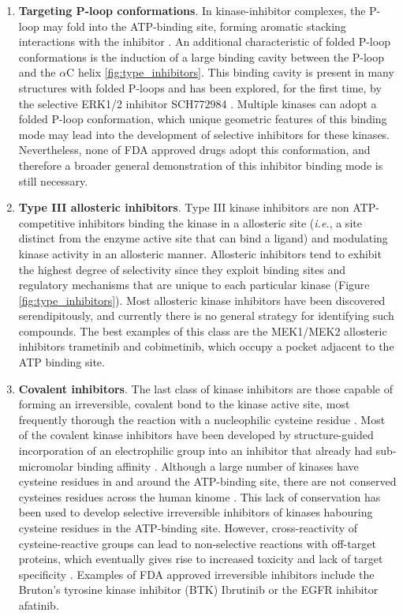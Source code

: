 \documentclass[11pt, b5paper,twoside]{tesi_upf}
\begin{document}
\begin{enumerate}
\item \textbf{Targeting P-loop conformations}. In kinase-inhibitor complexes, the P-loop may fold into the ATP-binding site, forming aromatic stacking interactions with the inhibitor \cite{Guimaraes2011}. An additional characteristic of folded P-loop conformations is the induction of a large binding cavity between the P-loop and the $\alpha$C helix \ref{fig:type_inhibitors}. This binding cavity is present in many structures with folded P-loops and has been explored, for the first time, by the selective ERK1/2 inhibitor SCH772984 \cite{Morris2013}. Multiple kinases can adopt a folded P-loop conformation, which unique geometric features of this binding mode may lead into the development of selective inhibitors for these kinases. Nevertheless, none of FDA approved drugs adopt this conformation, and therefore a broader general demonstration of this inhibitor binding mode is still necessary. 

\item \textbf{Type III allosteric inhibitors}. Type III kinase inhibitors are non ATP-competitive inhibitors binding the kinase in a allosteric site (\textit{i.e.}, a site distinct from the enzyme active site that can bind a ligand) and modulating kinase activity in an allosteric manner. Allosteric inhibitors tend to exhibit the highest degree of selectivity since they exploit binding sites and regulatory mechanisms that are unique to each particular kinase (Figure \ref{fig:type_inhibitors}). Most allosteric kinase inhibitors have been discovered serendipitously, and currently there is no general strategy for identifying such compounds. The best examples of this class are the MEK1/MEK2 allosteric inhibitors trametinib and cobimetinib, which occupy a pocket adjacent to the ATP binding site. 

\item \textbf{Covalent inhibitors}. The last class of kinase inhibitors are those capable of forming an irreversible, covalent bond to the kinase active site, most frequently thorough the reaction with a nucleophilic cysteine residue \cite{Cohen2005}. Most of the covalent kinase inhibitors have been developed by structure-guided incorporation of an electrophilic group into an inhibitor that already had sub-micromolar binding affinity \cite{Potashman2009}. Although a large number of kinases have cysteine residues in and around the ATP-binding site, there are not conserved cysteines residues across the human kinome \cite{Liu2013a}. This lack of conservation has been used to develop selective irreversible inhibitors of kinases habouring cysteine residues in the ATP-binding site. However, cross-reactivity of cysteine-reactive groups can lead to non-selective reactions with off-target proteins, which eventually gives rise to increased toxicity and lack of target specificity \cite{Barf2012, Liebler2008}. Examples of FDA approved irreversible inhibitors include the Bruton's tyrosine kinase inhibitor (BTK) Ibrutinib or the EGFR inhibitor afatinib.
 
 
\end{enumerate}  
 
\end{document}
